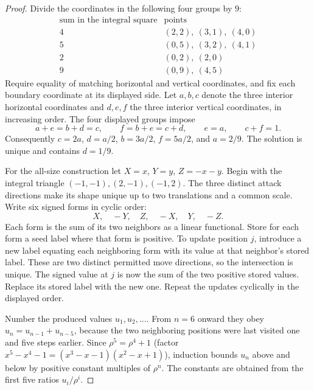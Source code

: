 \documentclass[11pt]{article}
\begin{document}
\begin{proof}
Divide the coordinates in the following four groups by $9$:
\[
 \begin{array}{c|l}
 \text{sum in the integral square}&\text{points}\\ \hline
 4&(2,2),\ (3,1),\ (4,0)\\
 5&(0,5),\ (3,2),\ (4,1)\\
 2&(0,2),\ (2,0)\\
 9&(0,9),\ (4,5)
 \end{array}
\]
Require equality of matching horizontal and vertical coordinates, and fix each boundary coordinate at its displayed side. Let $a,b,c$ denote the three interior horizontal coordinates and $d,e,f$ the three interior vertical coordinates, in increasing order. The four displayed groups impose
\[
 a+e=b+d=c,\qquad f=b+e=c+d,\qquad e=a,\qquad c+f=1 .
\]
Consequently $c=2a$, $d=a/2$, $b=3a/2$, $f=5a/2$, and $a=2/9$. The solution is unique and contains $d=1/9$.

For the all-size construction let $X=x$, $Y=y$, $Z=-x-y$. Begin with the integral triangle $(-1,-1),(2,-1),(-1,2)$. The three distinct attack directions make its shape unique up to two translations and a common scale. Write six signed forms in cyclic order:
\[
 X,\quad -Y,\quad Z,\quad -X,\quad Y,\quad -Z.
\]
Each form is the sum of its two neighbors as a linear functional. Store for each form a seed label where that form is positive. To update position $j$, introduce a new label equating each neighboring form with its value at that neighbor's stored label. These are two distinct permitted move directions, so the intersection is unique. The signed value at $j$ is now the sum of the two positive stored values. Replace its stored label with the new one. Repeat the updates cyclically in the displayed order.

Number the produced values $u_1,u_2,\ldots$. From $n=6$ onward they obey $u_n=u_{n-1}+u_{n-5}$, because the two neighboring positions were last visited one and five steps earlier. Since $\rho^5=\rho^4+1$ (factor $x^5-x^4-1=(x^3-x-1)(x^2-x+1)$), induction bounds $u_n$ above and below by positive constant multiples of $\rho^n$. The constants are obtained from the first five ratios $u_i/\rho^i$.


\end{proof}
\end{document}
